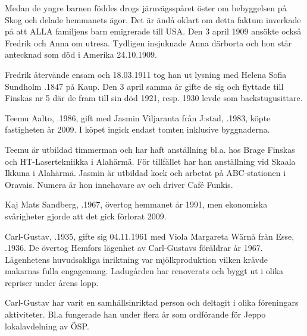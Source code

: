 Medan de yngre barnen föddes drogs järnvägsspåret öster om bebyggelsen på Skog och delade hemmanets ägor. Det är ändå oklart om detta faktum inverkade på att ALLA familjens barn emigrerade till USA. Den 3 april 1909 ansökte också Fredrik och Anna om utresa. Tydligen insjuknade Anna därborta och hon står antecknad som död i Amerika 24.10.1909.

Fredrik återvände ensam och 18.03.1911 tog han ut lysning med Helena Sofia Sundholm .1847 på Kaup. Den 3 april samma år gifte de sig och flyttade till Finskas nr 5 där de fram till sin död 1921, resp. 1930 levde som backstugusittare.






Teemu Aalto, .1986, gift med Jasmin Viljaranta från J:stad, .1983, köpte fastigheten år 2009. I köpet ingick endast tomten inklusive byggnaderna.

Teemu är utbildad timmerman och har haft anställning bl.a. hos Brage Finskas och HT-Lasertekniikka i Alahärmä. För tillfället har han anställning vid Skaala Ikkuna i Alahärmä. Jasmin är utbildad kock och arbetat på ABC-stationen i Oravais. Numera är hon innehavare av och driver Café Funkis.
\begin{jhchildren}
  \item {}
  \item {}
  \item {}
\end{jhchildren}


Kaj Mats Sandberg,  .1967, övertog hemmanet år 1991, men ekonomiska svårigheter gjorde att det gick förlorat 2009.\jhvspace{}


Carl-Gustav, .1935, gifte sig 04.11.1961 med Viola Margareta Wärnå från Esse, .1936. De övertog Hemfors lägenhet av Carl-Gustavs föräldrar år 1967. Lägenhetens huvudsakliga inriktning var mjölkproduktion vilken krävde makarnas fulla engagemang. Ladugården har renoverats och byggt ut i olika repriser under årens lopp.

Carl-Gustav har varit en samhällsinriktad person och deltagit i olika föreningars aktiviteter. Bl.a fungerade han under flera år som
ordförande för Jeppo lokalavdelning av ÖSP.
\begin{jhchildren}
  \item {}
  \item {}
  \item {}
  \item {}
\end{jhchildren}



